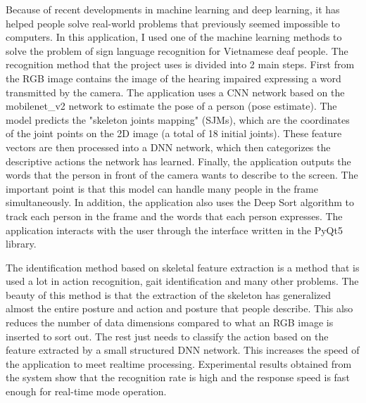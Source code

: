 Because of recent developments in machine learning and deep learning, it has helped people solve real-world problems that previously seemed impossible to computers. In this application, I used one of the machine learning methods to solve the problem of sign language recognition for Vietnamese deaf people. The recognition method that the project uses is divided into 2 main steps. First from the RGB image contains the image of the hearing impaired expressing a word transmitted by the camera. The application uses a CNN network based on the mobilenet\_v2 network to estimate the pose of a person (pose estimate). The model predicts the "skeleton joints mapping" (SJMs), which are the coordinates of the joint points on the 2D image (a total of 18 initial joints). These feature vectors are then processed into a DNN network, which then categorizes the descriptive actions the network has learned. Finally, the application outputs the words that the person in front of the camera wants to describe to the screen. The important point is that this model can handle many people in the frame simultaneously. In addition, the application also uses the Deep Sort algorithm to track each person in the frame and the words that each person expresses. The application interacts with the user through the interface written in the PyQt5 library.

The identification method based on skeletal feature extraction is a method that is used a lot in action recognition, gait identification and many other problems. The beauty of this method is that the extraction of the skeleton has generalized almost the entire posture and action and posture that people describe. This also reduces the number of data dimensions compared to what an RGB image is inserted to sort out. The rest just needs to classify the action based on the feature extracted by a small structured DNN network. This increases the speed of the application to meet realtime processing. Experimental results obtained from the system show that the recognition rate is high and the response speed is fast enough for real-time mode operation.

\newpage
{}
{\fontsize{12pt}{5pt}\selectfont
\tableofcontents}


\newpage
{}
\listoffigures


\newpage
{}
\listoftables


